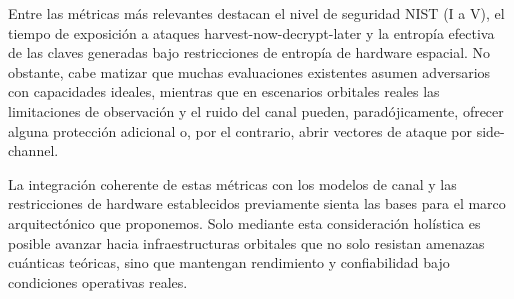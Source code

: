 Entre las métricas más relevantes destacan el nivel de seguridad NIST (I a V), el tiempo de exposición a ataques harvest-now-decrypt-later y la entropía efectiva de las claves generadas bajo restricciones de entropía de hardware espacial. No obstante, cabe matizar que muchas evaluaciones existentes asumen adversarios con capacidades ideales, mientras que en escenarios orbitales reales las limitaciones de observación y el ruido del canal pueden, paradójicamente, ofrecer alguna protección adicional o, por el contrario, abrir vectores de ataque por side-channel.

La integración coherente de estas métricas con los modelos de canal y las restricciones de hardware establecidos previamente sienta las bases para el marco arquitectónico que proponemos. Solo mediante esta consideración holística es posible avanzar hacia infraestructuras orbitales que no solo resistan amenazas cuánticas teóricas, sino que mantengan rendimiento y confiabilidad bajo condiciones operativas reales.